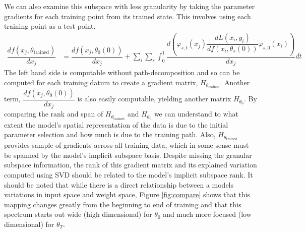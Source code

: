 



We can also examine this subspace with less granularity by taking the parameter gradients for each training point from its trained state. This involves using each training point as a test point. 
\begin{align}
    \dfrac{df(x_j, \theta_\text{trained})}{dx_j} &= \dfrac{df(x_j, \theta_0(0))}{dx_j} + \sum_i \sum_s \int_0^1 \dfrac{d\left(\varphi_{s,t}(x_j) \dfrac{dL(x_i, y_i)}{df(x_i, \theta_s(0))} \varphi_{s, 0}(x_i)\right)}{dx_j} dt
\end{align}
The left hand side is computable without path-decomposition and so can be computed for each training datum to create a gradient matrix, $H_{\theta_\text{trained}}$. Another term, $\dfrac{df(x_j, \theta_0(0))}{dx_j}$ is also easily computable, yielding another matrix $H_{\theta_0}$. By comparing the rank and span of $H_{\theta_\text{trained}}$ and $H_{\theta_0}$ we can understand to what extent the model's spatial representation of the data is due to the initial parameter selection and how much is due to the training path. Also, $H_{\theta_\text{trained}}$ provides sample of gradients across all training data, which in some sense must be spanned by the model's implicit subspace basis. Despite missing the granular subspace information, the rank of this gradient matrix and its explained variation computed using SVD should be related to the model's implicit subspace rank. 
It should be noted that while there is a direct relationship between a models variations in input space and weight space, Figure \ref{fig:compare} shows that this mapping changes greatly from the beginning to end of training and that this spectrum starts out wide (high dimensional) for $\theta_0$ and much more focused (low dimensional) for $\theta_T$. 


